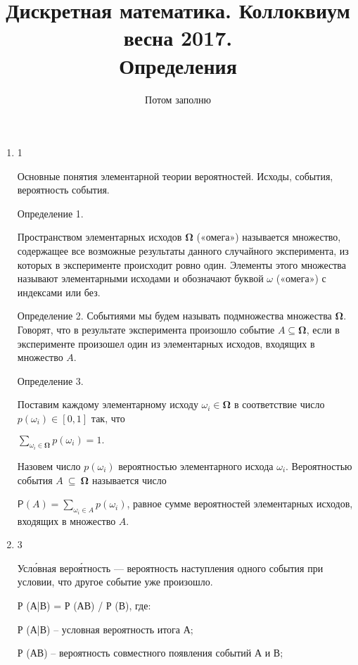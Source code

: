 \documentclass[a4paper,12pt]{article}
\begin{document}
	\title{Дискретная математика. Коллоквиум весна 2017.\\ Определения}
	\author{Потом заполню}
	\maketitle
	
	\begin{enumerate}
	
	 \item 1
    
    Основные понятия элементарной теории вероятностей. Исходы, события, вероятность события.

	Определение 1.
    
	Пространством элементарных исходов   ${\mathbf \Omega}$ («омега») называется множество, содержащее все возможные результаты 	данного случайного эксперимента, из которых в эксперименте происходит ровно один. Элементы этого множества называют элементарными исходами  и обозначают буквой $\omega$ («омега») с индексами или без.

	Определение 2.
	Событиями  мы будем называть подмножества множества ${\mathbf \Omega}$. Говорят, что в результате эксперимента произошло событие  	$A\subseteq \mathbf \Omega$, если в эксперименте произошел один из элементарных исходов, входящих в множество $A$.

	Определение 3.

	Поставим каждому элементарному исходу  $\omega_i\in \mathbf\Omega$ в соответствие число  $p (\omega_i)\in [0,1]$ так, что

	$\sum_{\omega_i\in \mathbf\Omega} p(\omega_i) =1.$

	Назовем число $p (\omega_i)$ вероятностью  элементарного исхода $\omega_i$. Вероятностью  события $A~\subseteq~\mathbf\Omega$ 	называется число

	${\mathsf P}(A) = \sum_{\omega_i\in A} p(\omega_i)$,
	равное сумме вероятностей элементарных исходов, входящих в множество $A$.
	
	\item 3
    
    Усло́вная вероя́тность — вероятность наступления одного события при условии, что другое событие уже произошло.
    
    Р (А|В) = Р (АВ) / Р (В), где: 
    
    
    Р (А|В) – условная вероятность итога А; 
    
    Р (АВ) – вероятность совместного появления событий А и В; 
    

\end{enumerate}
\end{document}
